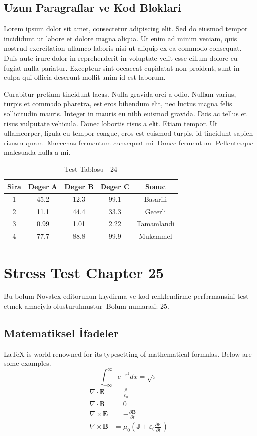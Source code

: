 \documentclass[12pt,a4paper]{article}
\begin{document}
\subsection{Uzun Paragraflar ve Kod Bloklari}
Lorem ipsum dolor sit amet, consectetur adipiscing elit. Sed do eiusmod tempor incididunt ut labore et dolore magna aliqua. Ut enim ad minim veniam, quis nostrud exercitation ullamco laboris nisi ut aliquip ex ea commodo consequat. Duis aute irure dolor in reprehenderit in voluptate velit esse cillum dolore eu fugiat nulla pariatur. Excepteur sint occaecat cupidatat non proident, sunt in culpa qui officia deserunt mollit anim id est laborum.

Curabitur pretium tincidunt lacus. Nulla gravida orci a odio. Nullam varius, turpis et commodo pharetra, est eros bibendum elit, nec luctus magna felis sollicitudin mauris. Integer in mauris eu nibh euismod gravida. Duis ac tellus et risus vulputate vehicula. Donec lobortis risus a elit. Etiam tempor. Ut ullamcorper, ligula eu tempor congue, eros est euismod turpis, id tincidunt sapien risus a quam. Maecenas fermentum consequat mi. Donec fermentum. Pellentesque malesuada nulla a mi.

\begin{table}[h!]
\centering
\begin{tabular}{|c|c|c|c|c|}
\hline
\textbf{Sira} & \textbf{Deger A} & \textbf{Deger B} & \textbf{Deger C} & \textbf{Sonuc} \\
\hline
1 & 45.2 & 12.3 & 99.1 & Basarili \\
2 & 11.1 & 44.4 & 33.3 & Gecerli \\
3 & 0.99 & 1.01 & 2.22 & Tamamlandi \\
4 & 77.7 & 88.8 & 99.9 & Mukemmel \\
\hline
\end{tabular}
\caption{Test Tablosu - 24}
\end{table}

\newpage
\section{Stress Test Chapter 25}
Bu bolum Novatex editorunun kaydirma ve kod renklendirme performansini test etmek amaciyla olusturulmustur. Bolum numarasi: 25.

\subsection{Matematiksel İfadeler}
\LaTeX{} is world-renowned for its typesetting of mathematical formulas. Below are some examples.
\begin{equation}
\int_{-\infty}^{\infty} e^{-x^2} dx = \sqrt{\pi}
\end{equation}
\begin{align}
\nabla \cdot \mathbf{E} &= \frac{\rho}{\varepsilon_0} \\
\nabla \cdot \mathbf{B} &= 0 \\
\nabla \times \mathbf{E} &= -\frac{\partial \mathbf{B}}{\partial t} \\
\nabla \times \mathbf{B} &= \mu_0\left(\mathbf{J} + \varepsilon_0 \frac{\partial \mathbf{E}}{\partial t}\right)
\end{align}
\end{document}
